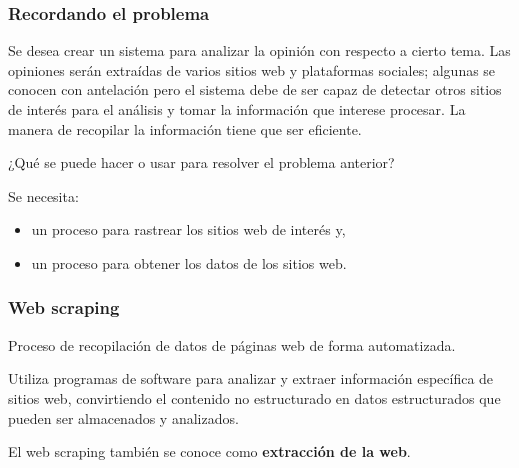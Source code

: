 \documentclass[
10pt, %
aspectratio=169, %
]{beamer}
\begin{document}
	\begin{frame}
		
		\frametitle{Recordando el problema}
		
		Se desea crear un sistema para analizar la opinión con respecto a cierto tema. Las opiniones serán extraídas de varios sitios web y plataformas sociales; algunas se conocen con antelación pero el sistema debe de ser capaz de detectar otros sitios de interés para el análisis y tomar la información que interese procesar. La manera de recopilar la información tiene que ser eficiente. 
		
		\vspace{2\baselineskip}
		
		¿Qué se puede hacer o usar para resolver el problema anterior?
		
		\vspace{3\baselineskip}
		
		Se necesita:
		\begin{itemize}
			\item un proceso para rastrear los sitios web de interés y,
			\item un proceso para obtener los datos de los sitios web.
		\end{itemize}
		
	\end{frame}
	
	\begin{frame}
		
		\frametitle{Web scraping}
		
		\begin{alertblock}{}
			Proceso de recopilación de datos de páginas web de forma automatizada. 
		\end{alertblock}
		
		\vspace{2\baselineskip}
		
		Utiliza programas de software para analizar y extraer información específica de sitios web, convirtiendo el contenido no estructurado en datos estructurados que pueden ser almacenados y analizados.
		
		\vspace{2\baselineskip}
		
		El web scraping también se conoce como \textbf{extracción de la web}.
		
	\end{frame}
	
\end{document}
